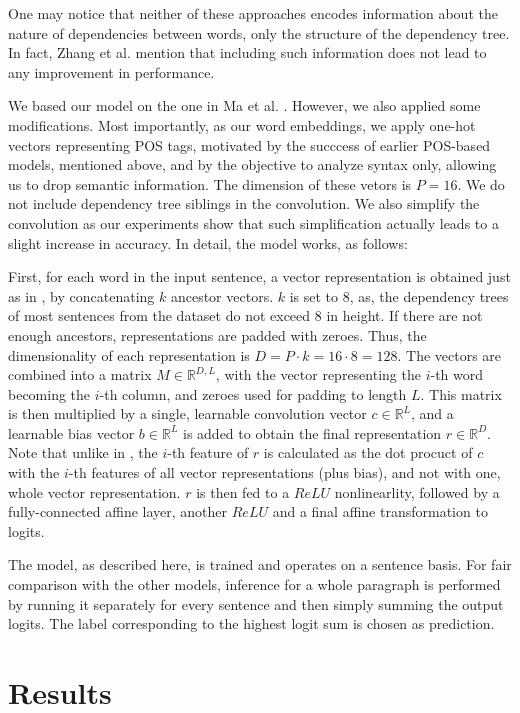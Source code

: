 \documentclass[twocolumn]{article}
\begin{document}
One may notice that neither of these approaches encodes information about the nature of dependencies between words, only the structure of the dependency tree. In fact, Zhang et al. mention that including such information does not lead to any improvement in performance.

We based our model on the one in Ma et al. \cite{ancestors}. However, we also applied some modifications. Most importantly, as our word embeddings, we apply one-hot vectors representing POS tags, motivated by the succcess of earlier POS-based models, mentioned above, and by the objective to analyze syntax only, allowing us to drop semantic information. The dimension of these vetors is $P=16$. We do not include dependency tree siblings in the convolution. We also simplify the convolution as our experiments show that such simplification actually leads to a slight increase in accuracy. In detail, the model works, as follows:

First, for each word in the input sentence, a vector representation is obtained just as in \cite{ancestors}, by concatenating $k$ ancestor vectors. $k$ is set to $8$, as, the dependency trees of most sentences from the dataset do not exceed $8$ in height. If there are not enough ancestors, representations are padded with zeroes. Thus, the dimensionality of each representation is $D=P\cdot k = 16 \cdot 8 = 128$. The vectors are combined into a matrix $M \in \mathbb{R}^{D, L}$, with the vector representing the $i$-th word becoming the $i$-th column, and zeroes used for padding to length $L$. This matrix is then multiplied by a single, learnable convolution vector $c \in \mathbb{R}^{L}$, and a learnable bias vector $b \in \mathbb{R}^{L}$ is added to obtain the final representation $r \in \mathbb{R}^{D}$. Note that unlike in \cite{ancestors}, the $i$-th feature of $r$ is calculated as the dot procuct of $c$ with the $i$-th features of all vector representations (plus bias), and not with one, whole vector representation. $r$ is then fed to a $ReLU$ nonlinearlity, followed by a fully-connected affine layer, another $ReLU$ and a final affine transformation to logits.
 
The model, as described here, is trained and operates on a sentence basis. For fair comparison with the other models, inference for a whole paragraph is performed by running it separately for every sentence and then simply summing the output logits. The label corresponding to the highest logit sum is chosen as prediction.

\section*{Results}
\end{document}
